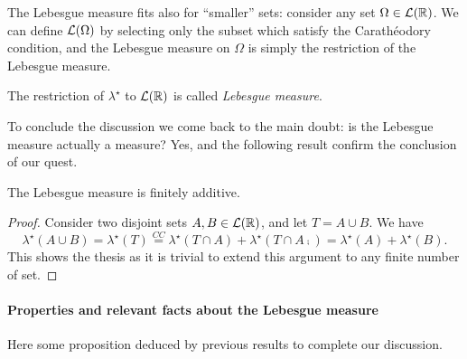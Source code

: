 The Lebesgue measure fits also for ``smaller'' sets: consider any set $\Omega \in \mathcal L(\mathbb R)$. We can define $\mathcal L(\Omega)$ by selecting only the subset which satisfy the Carathéodory condition, and the Lebesgue measure on $\Omega$ is simply the restriction of the Lebesgue measure.

\begin{defn}
	The restriction of $\lambda^\star$ to $\mathcal L(\mathbb R)$ is called \emph{Lebesgue measure}.	
\end{defn}

To conclude the discussion we come back to the main doubt: is the Lebesgue measure actually a measure? 
Yes, and the following result confirm the conclusion of our quest.

\begin{theo}
	The Lebesgue measure is finitely additive. 
\end{theo}
\begin{proof}
	Consider two disjoint sets $A, B \in \mathcal L(\mathbb R)$, and let $T= A \cup B$. We have $$\lambda^\star(A\cup B) = \lambda^\star(T) \overset{\textit{CC}}{=} \lambda^\star(T\cap A) + \lambda^\star(T \cap A\comp) = \lambda^\star(A) + \lambda^\star(B).$$ This shows the thesis as it is trivial to extend this argument to any finite number of set.
\end{proof}

\paragraph{Properties and relevant facts about the Lebesgue measure} Here some proposition deduced by previous results to complete our discussion.

